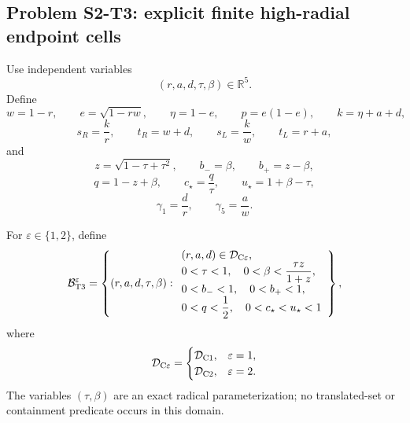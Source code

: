 \subsection{Problem S2-T3: explicit finite high-radial endpoint cells}

Use independent variables
\[
 (r,a,d,\tau,\beta)\in\mathbb R^5.
\]
Define
\[
 w=1-r,\qquad
 e=\sqrt{1-rw},\qquad
 \eta=1-e,\qquad
 p=e(1-e),\qquad
 k=\eta+a+d,
\]
\[
 s_R=\frac{k}{r},\qquad
 t_R=w+d,\qquad
 s_L=\frac{k}{w},\qquad
 t_L=r+a,
\]
and
\[
 z=\sqrt{1-\tau+\tau^2},\qquad
 b_-=\beta,\qquad
 b_+=z-\beta,
\]
\[
 q=1-z+\beta,\qquad
 c_\star=\frac q\tau,\qquad
 u_\star=1+\beta-\tau,
\]
\[
 \gamma_1=\frac d r,\qquad
 \gamma_5=\frac a w.
\]

\begin{definition}
\label{def:s2-t3-source-domain}
For \(\varepsilon\in\{1,2\}\), define
\[
 \mathcal B_{\rm T3}^{\varepsilon}
 =
 \left\{
 (r,a,d,\tau,\beta):
 \begin{array}{l}
 (r,a,d)\in\mathcal D_{\rm C\varepsilon},\\
 0<\tau<1,\quad
 0<\beta<\dfrac{\tau z}{1+z},\\
 0<b_-<1,\quad 0<b_+<1,\\
 0<q<\dfrac12,\quad
 0<c_\star<u_\star<1
 \end{array}
 \right\},
\]
where
\[
 \mathcal D_{\rm C\varepsilon}
 =
 \begin{cases}
 \mathcal D_{\rm C1},&\varepsilon=1,\\
 \mathcal D_{\rm C2},&\varepsilon=2.
 \end{cases}
\]
The variables \((\tau,\beta)\) are an exact radical parameterization; no
translated-set or containment predicate occurs in this domain.
\end{definition}

